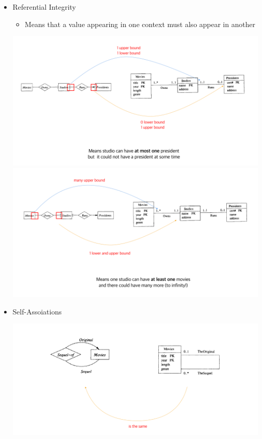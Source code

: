 \documentclass[12pt]{article}
\begin{document}
\begin{enumerate}[1.]
\begin{itemize}
        \item Referential Integrity
        \begin{itemize}
            \item Means that a value appearing in one context must also appear in another
        \end{itemize}

        \bigskip

        \begin{center}
        \includegraphics[width=\linewidth]{images/worksheet_15_solution_5.png}
        \includegraphics[width=\linewidth]{images/worksheet_15_solution_6.png}
        \end{center}

        \item Self-Assoiations

        \begin{center}
        \includegraphics[width=\linewidth]{images/worksheet_15_solution_7.png}
        \end{center}



\end{itemize}
\end{enumerate}
\end{document}
